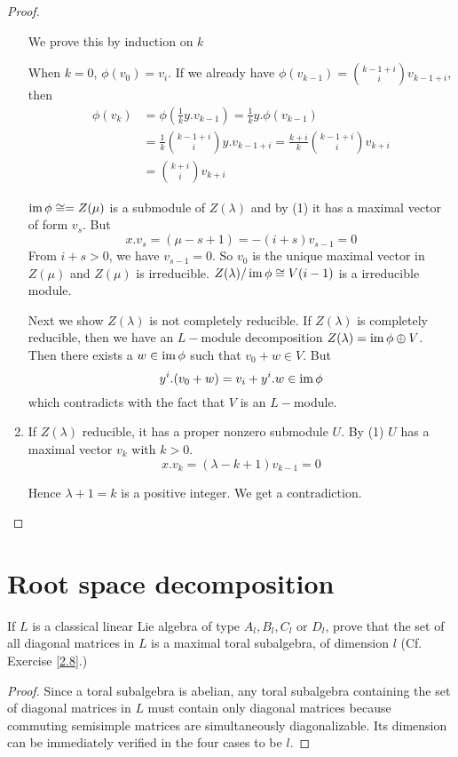 \begin{proof}
\begin{enumerate}
    We prove this by induction on $k$

    When $k=0$, $\phi(v_0)=v_i$.
    If we already have $\phi(v_{k-1})=\binom{k-1+i}{i}v_{k-1+i}$, then
    \begin{align*}
      \phi(v_k) & = \phi(\frac{1}{k}y.v_{k-1}) = \frac{1}{k} y.\phi(v_{k-1}) \\
       & = \frac{1}{k}\binom{k-1+i}{i} y.v_{k-1+i} = \frac{k+i}{k}\binom{k-1+i}{i}v_{k+i} \\
       & = \binom{k+i}{i}v_{k+i}
    \end{align*}

    $\operatorname{im}\phi\cong= Z(\mu)$ is a submodule of $Z(\lambda)$ and by (1) it has a maximal vector of form $v_s$. But
    \begin{equation*}
      x.v_s = (\mu-s+1) = -(i + s)v_{s-1} = 0
    \end{equation*}
    From $i + s > 0$, we have $v_{s-1} = 0$. So $v_0$ is the unique maximal vector in $Z(\mu)$ and $Z(\mu)$ is irreducible. $Z(\lambda)/\operatorname{im}\phi\cong V(i-1)$ is a irreducible module.

    Next we show $Z(\lambda)$ is not completely reducible. If $Z(\lambda)$ is completely reducible, then we have an $L-$module decomposition $Z(\lambda)=\operatorname{im}\phi\oplus V$. Then there exists a $w\in\operatorname{im}\phi$ such that $v_0+w\in V$. But
    \begin{equation*}
      y^i.(v_0+w)=v_i+y^i.w\in\operatorname{im}\phi
    \end{equation*}
    which contradicts with the fact that $V$ is an $L-$module.
    \item If $Z(\lambda)$ reducible, it has a proper nonzero submodule $U$. By (1) $U$ has a maximal vector $v_k$ with $k > 0$.
        \begin{equation*}
          x.v_k = (\lambda- k + 1)v_{k-1} = 0
        \end{equation*}

        Hence $\lambda + 1 = k$ is a positive integer. We get a contradiction.
  \end{enumerate}
\end{proof}

\section{Root space decomposition}




\begin{ex}\label{8.1}
  If $L$ is a classical linear Lie algebra of type $A_l,B_l,C_l$ or $D_l$, prove that the set of all diagonal matrices in $L$ is a maximal toral subalgebra, of dimension $l$ (Cf. Exercise \ref{2.8}.)
\end{ex}
\begin{proof}
  Since a toral subalgebra is abelian, any toral subalgebra containing the set of diagonal matrices in $L$ must contain only diagonal matrices because commuting semisimple matrices are simultaneously diagonalizable. Its dimension can be immediately verified in the four cases to be $l$.
\end{proof}


